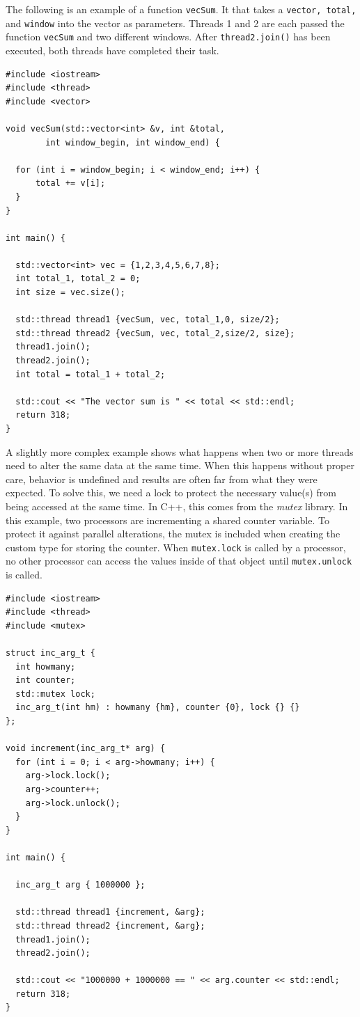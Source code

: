 \documentclass[12pt,twoside]{reedthesis}
\begin{document}
The following is an example of a function \texttt{vecSum}. It that takes a \texttt{vector, total,} and \texttt{window} into the vector as parameters. Threads 1 and 2 are each passed the function  \texttt{vecSum} and two different windows. After  \texttt{thread2.join()} has been executed, both threads have completed their task. 

\begin{lstlisting}
#include <iostream>
#include <thread>
#include <vector>

void vecSum(std::vector<int> &v, int &total, 
        int window_begin, int window_end) {
            
  for (int i = window_begin; i < window_end; i++) {
      total += v[i];
  }
}

int main() {

  std::vector<int> vec = {1,2,3,4,5,6,7,8};
  int total_1, total_2 = 0;
  int size = vec.size();

  std::thread thread1 {vecSum, vec, total_1,0, size/2}; 
  std::thread thread2 {vecSum, vec, total_2,size/2, size};
  thread1.join();
  thread2.join();
  int total = total_1 + total_2;

  std::cout << "The vector sum is " << total << std::endl;
  return 318;
}

\end{lstlisting}

A slightly more complex example shows what happens when two or more threads need to alter the same data at the same time. When this happens without proper care, behavior is undefined and results are often far from what they were expected. To solve this, we need a lock to protect the necessary value(s) from being accessed at the same time. In C++, this comes from the \textit{mutex} library. In this example, two processors are incrementing a shared counter variable. To protect it against parallel alterations, the mutex is included when creating the custom type for storing the counter. When  \texttt{mutex.lock} is called by a processor, no other processor can access the values inside of that object until  \texttt{mutex.unlock} is called.

\begin{lstlisting}
#include <iostream>
#include <thread>
#include <mutex>

struct inc_arg_t {
  int howmany;
  int counter;
  std::mutex lock;
  inc_arg_t(int hm) : howmany {hm}, counter {0}, lock {} {}
};

void increment(inc_arg_t* arg) {
  for (int i = 0; i < arg->howmany; i++) {
    arg->lock.lock();
    arg->counter++;
    arg->lock.unlock();
  }
}

int main() {

  inc_arg_t arg { 1000000 };

  std::thread thread1 {increment, &arg};
  std::thread thread2 {increment, &arg};
  thread1.join();
  thread2.join();

  std::cout << "1000000 + 1000000 == " << arg.counter << std::endl;
  return 318;
}

\end{lstlisting}
\end{document}

